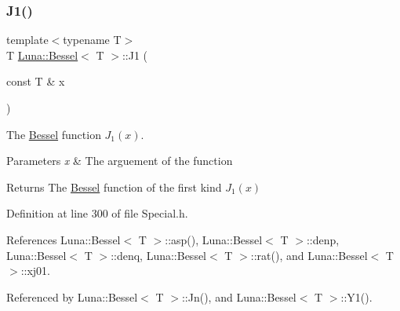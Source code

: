 \subsubsection{\texorpdfstring{J1()}{J1()}}
{\footnotesize\ttfamily template$<$typename T$>$ \\
T \hyperlink{structLuna_1_1Bessel}{Luna\+::\+Bessel}$<$ T $>$\+::J1 (\begin{DoxyParamCaption}\item[{const T \&}]{x }\end{DoxyParamCaption})\hspace{0.3cm}{\ttfamily [inline]}}



The \hyperlink{structLuna_1_1Bessel}{Bessel} function $ J_1(x) $. 


\begin{DoxyParams}{Parameters}
{\em x} & The arguement of the function \\
\hline
\end{DoxyParams}
\begin{DoxyReturn}{Returns}
The \hyperlink{structLuna_1_1Bessel}{Bessel} function of the first kind $ J_1(x) $ 
\end{DoxyReturn}


Definition at line 300 of file Special.\+h.



References Luna\+::\+Bessel$<$ T $>$\+::asp(), Luna\+::\+Bessel$<$ T $>$\+::denp, Luna\+::\+Bessel$<$ T $>$\+::denq, Luna\+::\+Bessel$<$ T $>$\+::rat(), and Luna\+::\+Bessel$<$ T $>$\+::xj01.



Referenced by Luna\+::\+Bessel$<$ T $>$\+::\+Jn(), and Luna\+::\+Bessel$<$ T $>$\+::\+Y1().


